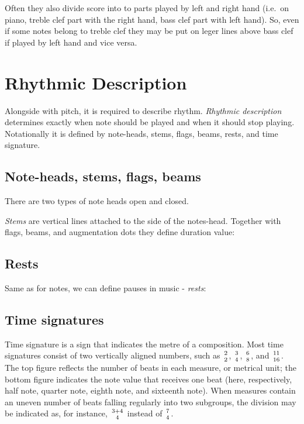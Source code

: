
Often they also divide score into to parts played by left and right hand (i.e.\ on piano, treble clef part with
the right hand, bass clef part with left hand). So, even if some notes belong to treble clef they may be put on leger
lines above bass clef if played by left hand and vice versa.



\section{Rhythmic Description}\label{sec:rhythmic-description}
Alongside with pitch, it is required to describe rhythm. \textit{Rhythmic description} determines exactly when note
should be played and when it should stop playing. Notationally it is defined by note-heads, stems, flags, beams, rests,
and time signature.

\subsection{Note-heads, stems, flags, beams}\label{subsec:note-heads}

There are two types of note heads open and closed.

\textit{Stems} are vertical lines attached to the side of the notes-head. Together with flags, beams, and augmentation
dots they define duration value:



\subsection{Rests}\label{subsec:rests}
Same as for notes, we can define pauses in music - \textit{rests}:



\subsection{Time signatures}\label{subsec:time-signatures}
Time signature is a sign that indicates the metre of a composition. Most time signatures consist of two vertically
aligned numbers, such as $2\atop2$, $3\atop4$, $6\atop8$, and $11\atop16$. The top figure reflects the number of beats
in each measure, or metrical unit; the bottom figure indicates the note value that receives one beat (here,
respectively, half note, quarter note, eighth note, and sixteenth note). When measures contain an uneven number of
beats falling regularly into two subgroups, the division may be indicated as, for instance, ${3+4}\atop4$ instead
of $7\atop4$\cite{time-signature}.


